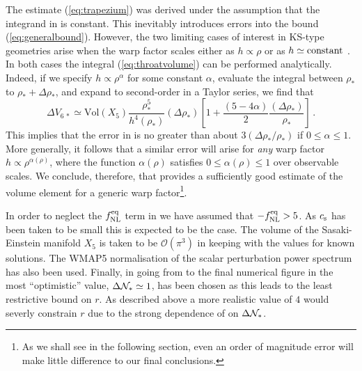 The estimate (\ref{eq:trapezium}) was derived under the assumption  
that the integrand in   
is constant. This inevitably introduces errors into the bound
(\ref{eq:generalbound}). However, the two limiting cases of interest 
in KS-type geometries arise 
when the warp factor scales either as $h \propto \rho$
or as $h \simeq {\rm constant}$ \cite{ks,kt}. In both cases
the integral (\ref{eq:throatvolume}) can be performed analytically. 
Indeed, if we specify $h \propto \rho^{\alpha}$ for some constant $\alpha$,  
evaluate the integral between $\rho_{*}$ 
to $\rho_{*}+\Delta \rho_{*}$, and expand to second-order in a 
Taylor series, we find that  
% 
\begin{equation}
\label{eq:limits}
\Delta V_{6\,*} \simeq \mathrm{Vol}(X_5) \frac{\rho^5_{*}}{h^{4} 
(\rho_{*} )}(\Delta \rho_*) 
\left[ 1 +\frac{(5-4 \alpha )}{2} 
\frac{(\Delta \rho_*)}{\rho_{*}} \right]  \,.
\end{equation}
% 
This implies that the error in  
is no greater than 
about $3 (\Delta \rho_* / \rho_*)$ if  
$0 \le \alpha \le 1$. More generally, it follows that a similar
error will arise for {\em any} warp factor 
$h \propto \rho^{\alpha (\rho )}$, where the function 
$\alpha (\rho)$ satisfies $0 \le \alpha (\rho ) \le 1$ 
over observable scales. 
We conclude, therefore, that  
provides a sufficiently good estimate of the volume element  
for a generic warp factor\footnote{As we shall see in the following section, 
even an order of magnitude error will make little 
difference to our final conclusions.}.

In order to neglect the $f_{\mathrm{NL}}^{\mathrm{eq}}$ term in  we have assumed that $-f_{\mathrm{NL}}^{\mathrm{eq}}>5$. As
$c_\mathrm{s}$ has been taken to be small this is expected to be the case. The volume of the Sasaki-Einstein
manifold $X_5$ is taken to be $\mathcal{O}(\pi^3)$ in keeping with the values for known solutions.
The WMAP5 normalisation of the scalar perturbation power spectrum has also been used. Finally, in
going from  to the final numerical figure in  the most
``optimistic'' value, $\Delta \mathcal{N}_*\simeq 1$, has been chosen as this leads to the least
restrictive bound on $r$.  As described above a more realistic value of $4$ would severly
constrain $r$ due to the strong dependence of  on $\Delta\mathcal{N}_*$.
% 
% 
% 
% 
